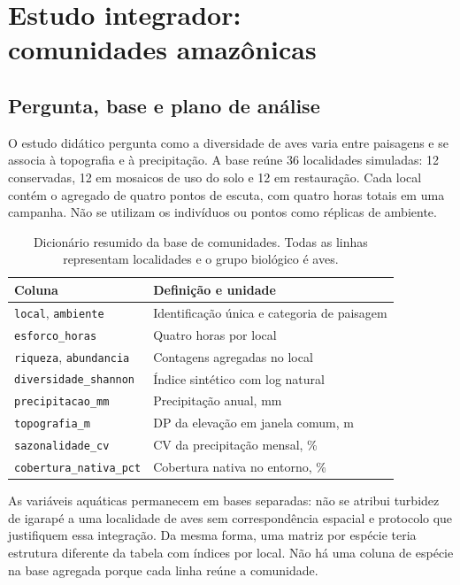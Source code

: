 \chapter[Estudo integrador: comunidades amazônicas]{Estudo integrador:\\comunidades amazônicas}

\section{Pergunta, base e plano de análise}
O estudo didático pergunta como a diversidade de aves varia entre paisagens e se associa à topografia e à precipitação. A base reúne 36 localidades simuladas: 12 conservadas, 12 em mosaicos de uso do solo e 12 em restauração. Cada local contém o agregado de quatro pontos de escuta, com quatro horas totais em uma campanha. Não se utilizam os indivíduos ou pontos como réplicas de ambiente.

\begin{table}[H]\centering\small
\caption{Dicionário resumido da base de comunidades. Todas as linhas representam localidades e o grupo biológico é aves.}
\begin{tabular}{p{.39\linewidth}p{.51\linewidth}}\toprule
Coluna & Definição e unidade\\\midrule
\texttt{local}, \texttt{ambiente} & Identificação única e categoria de paisagem\\
\texttt{esforco\_horas} & Quatro horas por local\\
\texttt{riqueza}, \texttt{abundancia} & Contagens agregadas no local\\
\texttt{diversidade\_shannon} & Índice sintético com log natural\\
\texttt{precipitacao\_mm} & Precipitação anual, mm\\
\texttt{topografia\_m} & DP da elevação em janela comum, m\\
\texttt{sazonalidade\_cv} & CV da precipitação mensal, \%\\
\texttt{cobertura\_nativa\_pct} & Cobertura nativa no entorno, \%\\\bottomrule
\end{tabular}\end{table}

As variáveis aquáticas permanecem em bases separadas: não se atribui turbidez de igarapé a uma localidade de aves sem correspondência espacial e protocolo que justifiquem essa integração. Da mesma forma, uma matriz por espécie teria estrutura diferente da tabela com índices por local. Não há uma coluna de espécie na base agregada porque cada linha reúne a comunidade.

